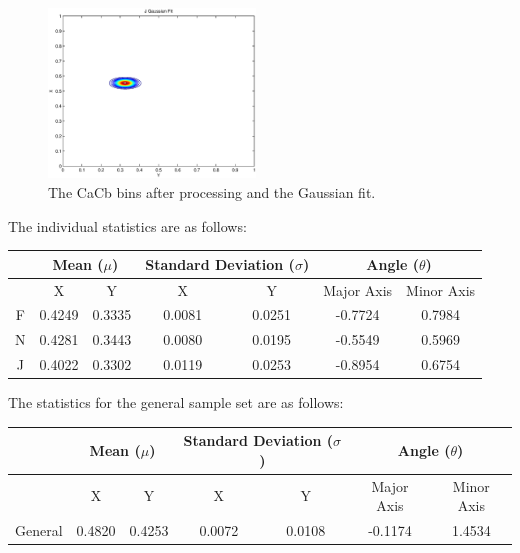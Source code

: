 \begin{figure}[h!]
    \includegraphics[width=0.49\textwidth]{Chapter3/Figs/JHands_XY_gFit.eps}
    \caption{The CaCb bins after processing and the Gaussian fit.}  \label{fig:FBinAndGFit}
\end{figure}

The individual statistics are as follows:
\newline

\begin{tabular}{|c|c|c|c|c|c|c|}
\hline
& \multicolumn{2}{|c|}{Mean ($\mu$)} & \multicolumn{2}{|c|}{Standard Deviation ($\sigma$)} & \multicolumn{2}{|c|}{Angle ($\theta$)} \\\hline
& X & Y & X & Y & Major Axis & Minor Axis \\\hline
F & 0.4249 & 0.3335 & 0.0081 & 0.0251 & -0.7724 & 0.7984 \\\hline
N & 0.4281 & 0.3443 & 0.0080 & 0.0195 & -0.5549 & 0.5969 \\\hline
J & 0.4022 & 0.3302 & 0.0119 & 0.0253 & -0.8954 & 0.6754 \\\hline
\end{tabular}
\newline
\vspace{0.5 cm}
\newline
The statistics for the general sample set are as follows:
\newline

\begin{tabular}{|c|c|c|c|c|c|c|}
\hline
& \multicolumn{2}{|c|}{Mean ($\mu$)} & \multicolumn{2}{|c|}{Standard Deviation ($\sigma$)} & \multicolumn{2}{|c|}{Angle ($\theta$)} \\\hline
& X & Y & X & Y & Major Axis & Minor Axis \\\hline
General & 0.4820 & 0.4253 & 0.0072 & 0.0108 & -0.1174 & 1.4534 \\\hline
\end{tabular}



